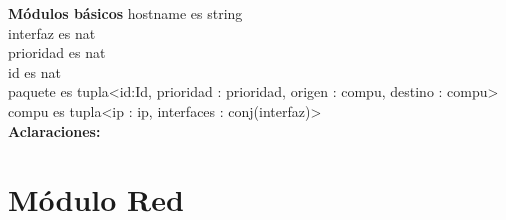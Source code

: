 \documentclass[a4paper,10pt]{article}
\begin{document}
\textbf{M\'odulos b\'asicos}
hostname es string\\
interfaz es nat\\
prioridad es nat\\
id es nat\\
paquete es tupla<id:Id, prioridad : prioridad, origen : compu, destino : compu>\\
compu es tupla<ip : ip, interfaces : conj(interfaz)>\\

\textbf{Aclaraciones:}



\section{Módulo Red}
\end{document}
